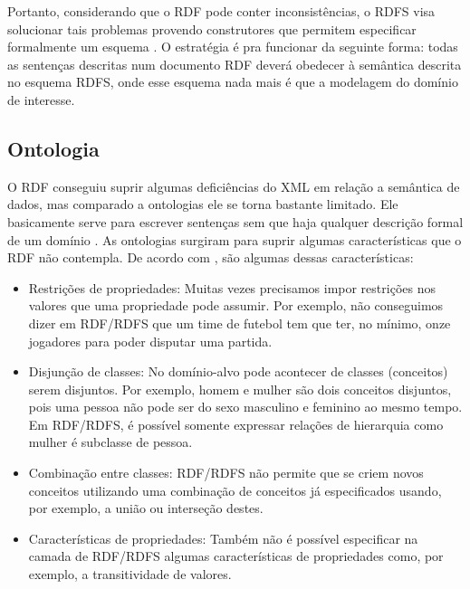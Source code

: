 Portanto, considerando que o RDF pode conter inconsistências, o RDFS visa solucionar tais problemas provendo construtores que permitem especificar formalmente um esquema \cite{filholoscio}. O estratégia é pra funcionar da seguinte forma: todas as sentenças descritas num documento RDF deverá obedecer à semântica descrita no esquema RDFS, onde esse esquema nada mais é que a modelagem do domínio de interesse.

\subsection{Ontologia}

O RDF conseguiu suprir algumas deficiências do XML em relação a semântica de dados, mas comparado a ontologias ele se torna bastante limitado. Ele basicamente serve para escrever sentenças sem que haja qualquer descrição formal de um domínio \cite{filholoscio}. As ontologias surgiram para suprir algumas características que o RDF não contempla. De acordo com \cite{filholoscio}, são algumas dessas características:

\begin{itemize}

\item Restrições de propriedades: Muitas vezes precisamos impor restrições nos valores que uma propriedade pode assumir. Por exemplo, não conseguimos dizer em RDF/RDFS que um time de futebol tem que ter, no mínimo, onze jogadores para poder disputar uma partida. 

\item Disjunção de classes: No domínio-alvo pode acontecer de classes (conceitos) serem disjuntos. Por exemplo, homem e mulher são dois conceitos disjuntos, pois uma pessoa não pode ser do sexo masculino e feminino ao mesmo tempo. Em RDF/RDFS, é possível somente expressar relações de hierarquia como mulher é subclasse de pessoa.

\item Combinação entre classes: RDF/RDFS não permite que se criem novos conceitos utilizando uma combinação de conceitos já especificados usando, por exemplo, a união ou interseção destes.  

\item Características de propriedades: Também não é possível especificar na camada de RDF/RDFS algumas características de propriedades como, por exemplo, a transitividade de valores.

\end{itemize}

